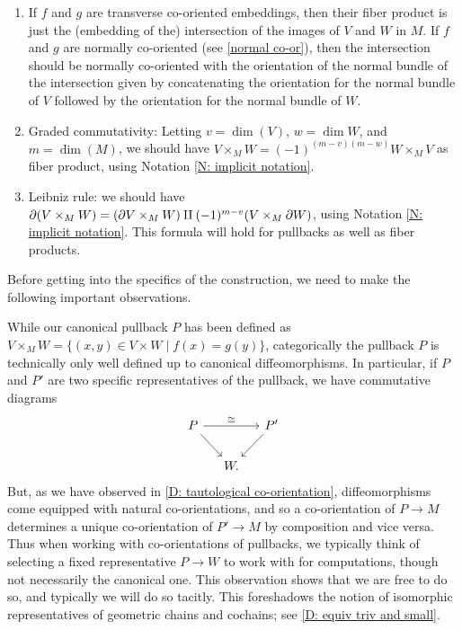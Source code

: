 \begin{enumerate}
	\item If $f$ and $g$ are transverse co-oriented embeddings, then their fiber product is just the (embedding of the) intersection of the images of $V$ and $W$ in $M$.
	If $f$ and $g$ are normally co-oriented (see \cref{normal co-or}), then the intersection should be normally co-oriented with the orientation of the normal bundle of the intersection given by concatenating the orientation for the normal bundle of $V$ followed by the orientation for the normal bundle of $W$.

	\item Graded commutativity: Letting $v = \dim(V)$, $w = \dim W$, and $m = \dim(M)$, we should have $V \times_M W = (-1)^{(m-v)(m-w)}W \times_M V$ as fiber product, using Notation \ref{N: implicit notation}.

	\item Leibniz rule: we should have $\partial (V \times_M W) = (\partial V \times_M W)\amalg (-1)^{m-v}(V \times_M \partial W)$, using Notation \ref{N: implicit notation}.
	This formula will hold for pullbacks as well as fiber products.
\end{enumerate}

Before getting into the specifics of the construction, we need to make the following important observations.

\begin{remark}\label{R: pullback representative}
	While our canonical pullback $P$ has been defined as $V \times_M W = \{(x,y) \in V \times W \mid f(x) = g(y)\}$, categorically the pullback $P$ is technically only well defined up to canonical diffeomorphisms.
	In particular, if $P$ and $P'$ are two specific representatives of the pullback, we have commutative diagrams
	\begin{equation}\label{D: comm triangle}
		\begin{tikzcd}[column sep=small]
			P \arrow[rr, "\cong"] \arrow[dr] & & P' \arrow[dl] \\
			& W. &
		\end{tikzcd}
	\end{equation}
	But, as we have observed in \cref{D: tautological co-orientation}, diffeomorphisms come equipped with natural co-orientations, and so a co-orientation of $P \to M$ determines a unique co-orientation of $P' \to M$ by composition and vice versa.
	Thus when working with co-orientations of pullbacks, we typically think of selecting a fixed representative $P \to W$ to work with for computations, though not necessarily the canonical one.
	This observation shows that we are free to do so, and typically we will do so tacitly.
	This foreshadows the notion of isomorphic representatives of geometric chains and cochains; see \cref{D: equiv triv and small}.
\end{remark}


